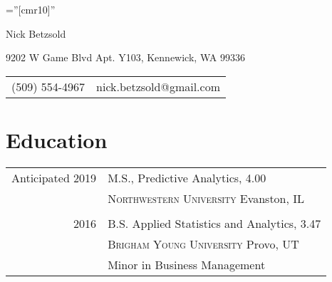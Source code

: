 \documentclass[a4paper,12pt]{article}
\begin{document}

\pagestyle{empty} %

\font\fb=''[cmr10]'' %

\par{\centering
		{\Huge Nick Betzsold
	}\par}

\par{\centering
    {9202 W Game Blvd Apt. Y103, Kennewick, WA 99336 \\
     \begin{tabular}{rl}
     (509) 554-4967 & nick.betzsold@gmail.com
     \end{tabular}
    }\par}

\section{Education}
\begin{tabular}{rp{11cm}}	
  Anticipated 2019 & M.S., Predictive Analytics, 4.00 \\
  & \textsc{Northwestern University} Evanston, IL \\ \\
  
  2016 & B.S. Applied Statistics and Analytics, 3.47 \\
  & \textsc{Brigham Young University} Provo, UT \\
  & Minor in Business Management \\
\end{tabular}


\end{document}

